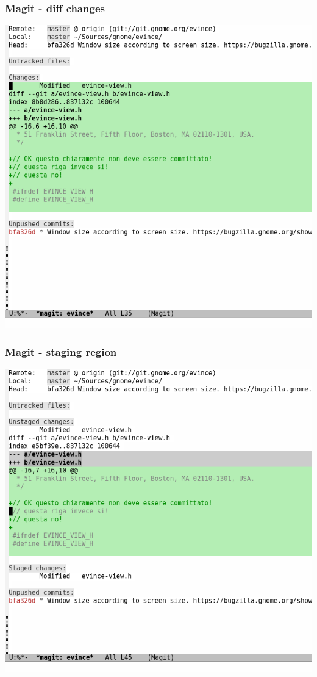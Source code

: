 \documentclass{beamer}
\begin{document}
\begin{frame}
\frametitle{Magit - diff changes}
\centering
\includegraphics[height=0.9\textheight]{images/magit_show_changes.png}
\end{frame}

\begin{frame}
\frametitle{Magit - staging region}
\centering
\includegraphics[height=0.9\textheight]{images/magit_staging_region.png}
\end{frame}
\end{document}
